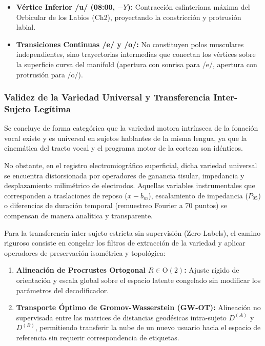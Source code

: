 \documentclass[11pt,a4paper,openany]{book}
\theoremstyle{definition}
\begin{document}
\begin{enumerate}
\begin{itemize}
        \item \textbf{Vértice Inferior /u/ (08:00, $-Y$):} Contracción esfinteriana máxima del Orbicular de los Labios (Ch2), proyectando la constricción y protrusión labial.
        \item \textbf{Transiciones Continuas /e/ y /o/:} No constituyen polos musculares independientes, sino trayectorias intermedias que conectan los vértices sobre la superficie curva del manifold (apertura con sonrisa para /e/, apertura con protrusión para /o/).
    \end{itemize}
\end{enumerate}

\subsubsection{Validez de la Variedad Universal y Transferencia Inter-Sujeto Legítima}
\label{subsubsec:validez_transferencia_universal}

Se concluye de forma categórica que la variedad motora intrínseca de la fonación vocal existe y es universal en sujetos hablantes de la misma lengua, ya que la cinemática del tracto vocal y el programa motor de la corteza son idénticos. 

No obstante, en el registro electromiográfico superficial, dicha variedad universal se encuentra distorsionada por operadores de ganancia tisular, impedancia y desplazamiento milimétrico de electrodos. Aquellas variables instrumentales que corresponden a traslaciones de reposo ($x - b_m$), escalamiento de impedancia ($P_{95}$) o diferencias de duración temporal (remuestreo Fourier a 70 puntos) se compensan de manera analítica y transparente.

Para la transferencia inter-sujeto estricta sin supervisión (Zero-Labels), el camino riguroso consiste en congelar los filtros de extracción de la variedad y aplicar operadores de preservación isométrica y topológica:
\begin{enumerate}
    \item \textbf{Alineación de Procrustes Ortogonal $R \in \text{O}(2)$:} Ajuste rígido de orientación y escala global sobre el espacio latente congelado sin modificar los parámetros del decodificador.
    \item \textbf{Transporte Óptimo de Gromov-Wasserstein (GW-OT):} Alineación no supervisada entre las matrices de distancias geodésicas intra-sujeto $D^{(A)}$ y $D^{(B)}$, permitiendo transferir la nube de un nuevo usuario hacia el espacio de referencia sin requerir correspondencia de etiquetas.
\end{enumerate}
\end{document}
